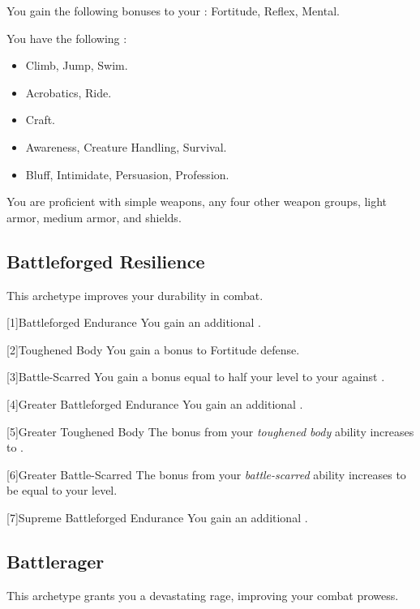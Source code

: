         You gain the following bonuses to your :  Fortitude,  Reflex,  Mental.

        You have the following :
        \begin{itemize}
            \item {} Climb, Jump, Swim.
            \item {} Acrobatics, Ride.
            \item {} Craft.
            \item {} Awareness, Creature Handling, Survival.
            \item {} Bluff, Intimidate, Persuasion, Profession.
        \end{itemize}

        You are proficient with simple weapons, any four other weapon groups, light armor, medium armor, and shields.

    \subsection{Battleforged Resilience}
        This archetype improves your durability in combat.

        [1]{Battleforged Endurance} You gain an additional .

        [2]{Toughened Body} You gain a  bonus to Fortitude defense.

        [3]{Battle-Scarred} You gain a bonus equal to half your level to your  against .

        [4]{Greater Battleforged Endurance} You gain an additional .

        [5]{Greater Toughened Body} The bonus from your \textit{toughened body} ability increases to .

        [6]{Greater Battle-Scarred}
        The bonus from your \textit{battle-scarred} ability increases to be equal to your level.

        [7]{Supreme Battleforged Endurance} You gain an additional .

    \subsection{Battlerager}\label{Rage}
        This archetype grants you a devastating rage, improving your combat prowess.

